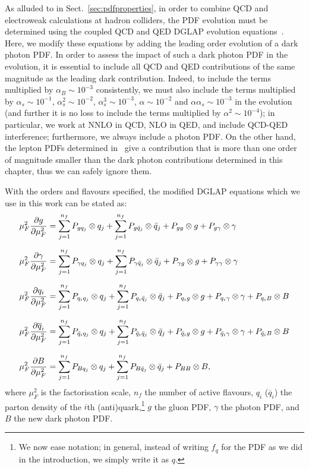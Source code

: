 \documentclass[withindex,glossary]{cam-thesis}
\begin{document}
As alluded to in Sect.~\ref{sec:pdfproperties}, in order to combine  QCD and electroweak
calculations at hadron colliders,
the PDF evolution must be determined using the coupled QCD and QED
DGLAP
evolution
equations~\cite{DeRujula:1979grv,Kripfganz:1988bd,Blumlein:1989gk}.
Here, we modify these equations by adding the leading order evolution of a dark photon PDF. 
%
In order to assess the impact of such a dark photon PDF in the
evolution, it is essential to include all QCD and QED contributions
of the same magnitude as the leading dark contribution. Indeed, to
include the terms multiplied by $\alpha_B \sim 10^{-3}$ consistently,
we must also include the terms multiplied by $\alpha_s \sim 10^{-1}$,
$\alpha_s^2 \sim 10^{-2}$, $\alpha_s^3 \sim 10^{-3}$, $\alpha \sim
10^{-2}$ and $\alpha\alpha_s \sim 10^{-3}$
in the evolution (and further it is no loss to include the terms
multiplied by $\alpha^2 \sim 10^{-4}$);
in particular, we work at NNLO in QCD, NLO in QED, and include QCD-QED
interference;
furthermore, we always include a photon PDF. On the other hand, the
lepton PDFs determined
in~\cite{Buonocore:2020erb,Buonocore:2020nai,Buonocore:2021bsf,Harland-Lang:2021zvr}
give a contribution that is more than one order of magnitude smaller
than the dark photon
contributions determined in this chapter, thus we can safely ignore them.


With the orders and flavours specified, the modified DGLAP equations which we use in this work can be stated as: 
%
\begin{align}
\label{eq:basicdglap}
\mu_F^2 \frac{\partial g}{\partial \mu_F^2} &= \sum_{j=1}^{n_f} P_{gq_j} \otimes q_j +\sum_{j=1}^{n_f} P_{g\bar{q}_j} \otimes \bar{q}_j + P_{gg}\otimes g + P_{g\gamma}\otimes \gamma \notag\\[1.5ex]
\mu_F^2 \frac{\partial \gamma}{\partial \mu_F^2} &= \sum_{j=1}^{n_f} P_{\gamma q_j} \otimes q_j +\sum_{j=1}^{n_f} P_{\gamma\bar{q}_j} \otimes \bar{q}_j + P_{\gamma g}\otimes g + P_{\gamma\gamma}\otimes\gamma\notag \\[1.5ex]
\mu_F^2 \frac{\partial q_i}{\partial \mu_F^2} &= \sum_{j=1}^{n_f} P_{q_iq_j} \otimes q_j +\sum_{j=1}^{n_f} P_{q_i\bar{q}_j} \otimes \bar{q}_j + P_{q_ig}\otimes g + P_{q_i\gamma}\otimes \gamma + P_{q_iB} \otimes B \\[1.5ex]
\mu_F^2 \frac{\partial \overline{q}_i}{\partial \mu_F^2} &= \sum_{j=1}^{n_f} P_{\bar{q}_iq_j} \otimes q_j +\sum_{j=1}^{n_f} P_{\bar{q}_i\bar{q}_j} \otimes \bar{q}_j + P_{\bar{q}_ig}\otimes g + P_{\bar{q}_i\gamma}\otimes \gamma + P_{\bar{q}_iB} \otimes B \notag\\[1.5ex]
\mu_F^2 \frac{\partial B}{\partial \mu_F^2} &= \sum_{j=1}^{n_f} P_{Bq_j} \otimes q_j +\sum_{j=1}^{n_f} P_{B\bar{q}_j} \otimes \bar{q}_j + P_{BB}\otimes B,\notag
\end{align}
%
where $\mu_F^2$ is the factorisation scale, $n_f$ the number of active
flavours, $q_i$ ($\overline{q}_i$) the parton density of the $i$th (anti)quark,\footnote{We now ease notation; in general, instead of writing $f_q$ for the PDF as we did in the introduction, we simply write it as $q$.} $g$ the gluon PDF, $\gamma$ the photon PDF, and
$B$ the new dark photon PDF.
\end{document}

